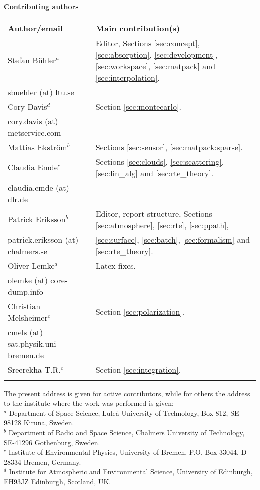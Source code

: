 %
\newpage
\thispagestyle{plain}
%
\begin{center}
  {\Large \bf Contributing authors}
\end{center}
\vspace*{10mm}
\begin{tabular}{lp{10mm}l}
  \hline
  {\bf Author/email} & & {\bf Main contribution(s)} \\
  \hline
  Stefan B\"uhler$^a$ & & Editor, Sections \ref{sec:concept},  
  \ref{sec:absorption}, \ref{sec:development}, \ref{sec:workspace},
  \ref{sec:matpack} and \ref{sec:interpolation}.\\
  sbuehler (at) ltu.se & &        \\
  \hline
  Cory Davis$^d$ & & Section \ref{sec:montecarlo}. \\
  cory.davis (at) metservice.com & & \\
  \hline
  Mattias Ekstr\"om$^b$ & & Sections \ref{sec:sensor}, 
  \ref{sec:matpack:sparse}. \\
  \hline
  Claudia Emde$^c$ & & Sections \ref{sec:clouds}, \ref{sec:scattering},
  \ref{sec:lin_alg} and \ref{sec:rte_theory}.\\
  claudia.emde (at) dlr.de & & \\
  \hline
  Patrick Eriksson$^b$ &  & Editor, report structure, 
  Sections \ref{sec:atmosphere}, \ref{sec:rte}, \ref{sec:ppath}, \\
  patrick.eriksson (at) chalmers.se & & 
  \ref{sec:surface}, \ref{sec:batch}, \ref{sec:formalism} and 
  \ref{sec:rte_theory}.\\
  \hline
  Oliver Lemke$^a$ & & Latex fixes.\\
  olemke (at) core-dump.info & & \\
  \hline
  Christian Melsheimer$^c$ & & Section \ref{sec:polarization}.\\
  cmels (at) sat.physik.uni-bremen.de & & \\
  \hline
  Sreerekha T.R.$^c$ & & Section \ref{sec:integration}.\\
  \hline
  &&\\
\end{tabular}

\noindent
The present address is given for active contributors, while for others
the address to the institute where the work was performed is given:\\
$^a$ Department of Space Science, Lule{\aa} University of Technology, 
Box 812, SE-98128 Kiruna, Sweden. \\
$^b$ Department of Radio and Space Science, Chalmers University of Technology,
SE-41296 Gothenburg, Sweden. \\
$^c$ Institute of Environmental Physics, University of Bremen, P.O. Box 33044, 
D-28334 Bremen, Germany. \\
$^d$ Institute for Atmospheric and Environmental Science, University of 
Edinburgh, EH93JZ Edinburgh, Scotland, UK. \\


